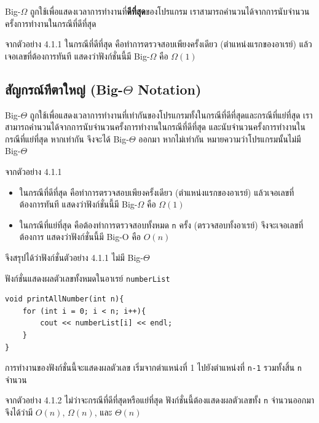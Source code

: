 Big-$\Omega$ ถูกใช้เพื่อแสดงเวลาการทำงานที่\textbf{ดีที่สุด}ของโปรแกรม เราสามารถคำนวนได้จากการนับจำนวนครั้งการทำงานในกรณีที่ดีที่สุด

จากตัวอย่าง 4.1.1 ในกรณีที่ดีที่สุด คือทำการตรวจสอบเพียงครั้งเดียว (ตำแหน่งแรกของอาเรย์) แล้วเจอเลขที่ต้องการทันที แสดงว่าฟังก์ชั่นนี้มี Big-$\Omega$ คือ $\Omega(1)$

\subsection{สัญกรณ์ทีตาใหญ่ (Big-$\Theta$ Notation)}

Big-$\Theta$ ถูกใช้เพื่อแสดงเวลาการทำงานที่เท่ากันของโปรแกรมทั้งในกรณีที่ดีที่สุดและกรณีที่แย่ที่สุด เราสามารถคำนวนได้จากการนับจำนวนครั้งการทำงานในกรณีที่ดีที่สุด และนับจำนวนครั้งการทำงานในกรณีที่แย่ที่สุด หากเท่ากัน จึงจะได้ Big-$\Theta$ ออกมา หากไม่เท่ากัน หมายความว่าโปรแกรมนั้นไม่มี Big-$\Theta$

จากตัวอย่าง 4.1.1 
\begin{itemize}
\item ในกรณีที่ดีที่สุด คือทำการตรวจสอบเพียงครั้งเดียว (ตำแหน่งแรกของอาเรย์) แล้วเจอเลขที่ต้องการทันที แสดงว่าฟังก์ชั่นนี้มี Big-$\Omega$ คือ $\Omega(1)$
\item ในกรณีที่แย่ที่สุด คือต้องทำการตรวจสอบทั้งหมด \texttt{n} ครั้ง (ตรวจสอบทั้งอาเรย์) จึงจะเจอเลขที่ต้องการ แสดงว่าฟังก์ชั่นนี้มี Big-O คือ $O(n)$
\end{itemize}
จึงสรุปได้ว่าฟังก์ชั่นตัวอย่าง 4.1.1 ไม่มี Big-$\Theta$

\begin{example}
ฟังก์ชั่นแสดงผลตัวเลขทั้งหมดในอาเรย์ \texttt{numberList}
\begin{lstlisting}
void printAllNumber(int n){
	for (int i = 0; i < n; i++){
		cout << numberList[i] << endl;
	}
}
\end{lstlisting}
การทำงานของฟังก์ชั่นนี้จะแสดงผลตัวเลข เริ่มจากตำแหน่งที่ 1 ไปยังตำแหน่งที่ \texttt{n-1} รวมทั้งสิ้น \texttt{n} จำนวน
\end{example}

จากตัวอย่าง 4.1.2 ไม่ว่าจะกรณีที่ดีที่สุดหรือแย่ที่สุด ฟังก์ชั่นนี้ต้องแสดงผลตัวเลขทั้ง \texttt{n} จำนวนออกมา จึงได้ว่ามี $O(n)$, $\Omega(n)$, และ $\Theta(n)$

\newpage

